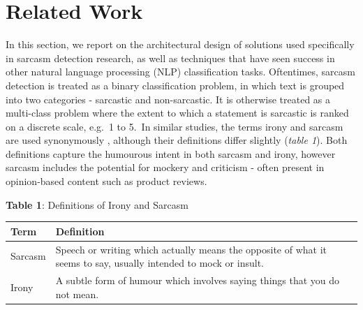 \documentclass[12pt,a4paper]{article}
\begin{document}
\section{Related Work}
\vspace{-4.2pt}
\noindent In this section, we report on the architectural design of solutions used specifically in sarcasm detection research, as well as techniques that have seen success in other natural language processing (NLP) classification tasks. Oftentimes, sarcasm detection is treated as a binary classification problem, in which text is grouped into two categories - sarcastic and non-sarcastic. It is otherwise treated as a multi-class problem where the extent to which a statement is sarcastic is ranked on a discrete scale, e.g.\ 1 to 5.\ In similar studies, the terms irony and sarcasm are used synonymously \cite{tsur2010icwsm}, although their definitions differ slightly (\textit{table 1}). Both definitions capture the humourous intent in both sarcasm and irony, however sarcasm includes the potential for mockery and criticism - often present in opinion-based content such as product reviews.\vspace{-5pt}

\begin{center}
	\textbf{Table 1}: Definitions of Irony and Sarcasm\vspace{-8pt}
\end{center}
\begin{center}
	\begin{tabular}{p{1.5cm}p{13.2cm}}
		\hline
		\textbf{Term} & \textbf{Definition}\\
		\hline\hline
		Sarcasm & Speech or writing which actually means the opposite of what it seems to say, usually intended to mock or insult.\footnotemark[1]\\
		\hline
		Irony & A subtle form of humour which involves saying things that you do not mean.\footnotemark[2]\\
		\hline
	\end{tabular}\\
\end{center}\vspace{-10pt}
\end{document}
